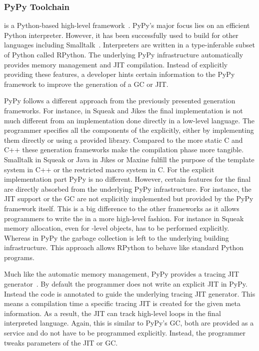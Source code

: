 \subsubsection*{PyPy Toolchain}
 is a Python-based high-level \VM framework~\cite{Rigo06a}.
PyPy's major focus lies on an efficient Python interpreter.
However, it has been successfully used to build \VMs for other languages including Smalltalk~\cite{Bolz08a}.
Interpreters are written in a type-inferable subset of Python called RPython.
The underlying PyPy infrastructure automatically provides memory management and JIT compilation.
Instead of explicitly providing these features, a \VM developer hints certain information to the PyPy framework to improve the generation of a GC or JIT.

PyPy follows a different approach from the previously presented \VM generation frameworks.
For instance, in Squeak and Jikes the final \VM implementation is not much different from an implementation done directly in a low-level language.
The programmer specifies all the components of the \VM explicitly, either by implementing them directly or using a provided library.
Compared to the more static C and C++ these \VM generation frameworks make the compilation phase more tangible.
Smalltalk in Squeak or Java in Jikes or Maxine fulfill the purpose of the template system in C++ or the restricted macro system in C.
For the explicit implementation part PyPy is no different.
However, certain features for the final \VM are directly absorbed from the underlying PyPy infrastructure.
For instance, the JIT support or the GC are not explicitly implemented but provided by the PyPy framework itself.
This is a big difference to the other \VM frameworks as it allows programmers to write the \VM in a more high-level fashion.
For instance in Squeak memory allocation, even for \VM-level objects, has to be performed explicitly.
Whereas in PyPy the garbage collection is left to the underlying \VM building infrastructure.
This approach allows RPython \VMs to behave like standard Python programs.

Much like the automatic memory management, PyPy provides a tracing JIT generator~\cite{Bolz09a}.
By default the \VM programmer does not write an explicit JIT in PyPy.
Instead the \VM code is annotated to guide the underlying tracing JIT generator.
This means a \VM compilation time a specific tracing JIT is created for the given meta information.
As a result, the JIT can track high-level loops in the final interpreted language.
Again, this is similar to PyPy's GC, both are provided as a service and do not have to be programmed explicitly.
Instead, the \VM programmer tweaks parameters of the JIT or GC.

